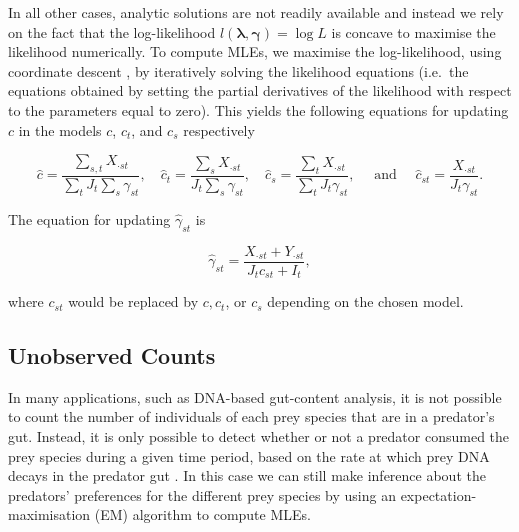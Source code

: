 \documentclass[smallextended]{svjour3}
\begin{document}
In all other cases, analytic solutions are not readily available and instead we rely on the fact that the log-likelihood $l(\boldsymbol{\lambda}, \boldsymbol{\gamma}) = \log{L}$ is concave to maximise the likelihood numerically.  To compute MLEs, we maximise the log-likelihood, using coordinate descent \citep{Luo:1992}, by iteratively solving the likelihood equations (i.e.\, the equations obtained by setting the partial derivatives of the likelihood with respect to the parameters equal to zero).  This yields the following equations for updating $c$ in the models $c$, $c_t$, and $c_s$ respectively

\begin{equation*}
  \hat{c} = \frac{\sum_{s,t} X_{\cdot st}}{\sum_t J_t \sum_s \gamma_{st}}, \quad \hat{c}_t =  \frac{\sum_s X_{\cdot st}}{J_t \sum_s \gamma_{st}}, \quad \hat{c}_s = \frac{\sum_{t}X_{\cdot st}}{\sum_t J_t \gamma_{st}}, \quad \text{ and } \quad \hat{c}_{st} = \frac{X_{\cdot st}}{J_t \gamma_{st}}.
\end{equation*}

\noindent The equation for updating $\hat \gamma_{st}$ is

\[ \hat{\gamma}_{st} = \frac{X_{\cdot st} + Y_{\cdot st}}{J_t c_{st} + I_t}, \]

\noindent where $c_{st}$ would be replaced by $c, c_t$, or $c_s$ depending on the chosen model.

\subsection{Unobserved Counts}
\label{sec:noncount}

In many applications, such as DNA-based gut-content analysis, it is not possible to count the number of individuals of each prey species that are in a predator's gut.  Instead, it is only possible to detect whether or not a predator consumed the prey species during a given time period, based on the rate at which prey DNA decays in the predator gut \citep{Greenstone:2013}.  In this case we can still make inference about the predators' preferences for the different prey species by using an expectation-maximisation (EM) algorithm to compute MLEs.
\end{document}
